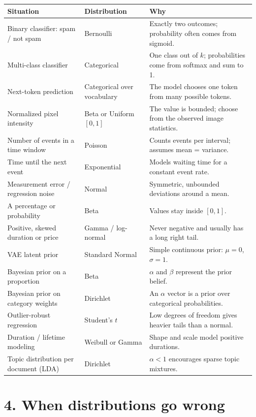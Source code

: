 \documentclass[11pt]{article}
\begin{document}
\renewcommand{\arraystretch}{1.35}
\begin{tabularx}{\textwidth}{>{\raggedright\arraybackslash}p{} >{\raggedright\arraybackslash}p{} X}
\toprule
\textbf{Situation} & \textbf{Distribution} & \textbf{Why} \\
\midrule
Binary classifier: spam / not spam & Bernoulli & Exactly two outcomes; probability often comes from sigmoid. \\
Multi-class classifier & Categorical & One class out of $k$; probabilities come from softmax and sum to 1. \\
Next-token prediction & Categorical over vocabulary & The model chooses one token from many possible tokens. \\
Normalized pixel intensity & Beta or Uniform $[0,1]$ & The value is bounded; choose from the observed image statistics. \\
Number of events in a time window & Poisson & Counts events per interval; assumes mean = variance. \\
Time until the next event & Exponential & Models waiting time for a constant event rate. \\
Measurement error / regression noise & Normal & Symmetric, unbounded deviations around a mean. \\
A percentage or probability & Beta & Values stay inside $[0,1]$. \\
Positive, skewed duration or price & Gamma / log-normal & Never negative and usually has a long right tail. \\
VAE latent prior & Standard Normal & Simple continuous prior: $\mu=0$, $\sigma=1$. \\
Bayesian prior on a proportion & Beta & $\alpha$ and $\beta$ represent the prior belief. \\
Bayesian prior on category weights & Dirichlet & An $\alpha$ vector is a prior over categorical probabilities. \\
Outlier-robust regression & Student's $t$ & Low degrees of freedom gives heavier tails than a normal. \\
Duration / lifetime modeling & Weibull or Gamma & Shape and scale model positive durations. \\
Topic distribution per document (LDA) & Dirichlet & $\alpha<1$ encourages sparse topic mixtures. \\
\bottomrule
\end{tabularx}

\section*{4. When distributions go wrong}
\end{document}
